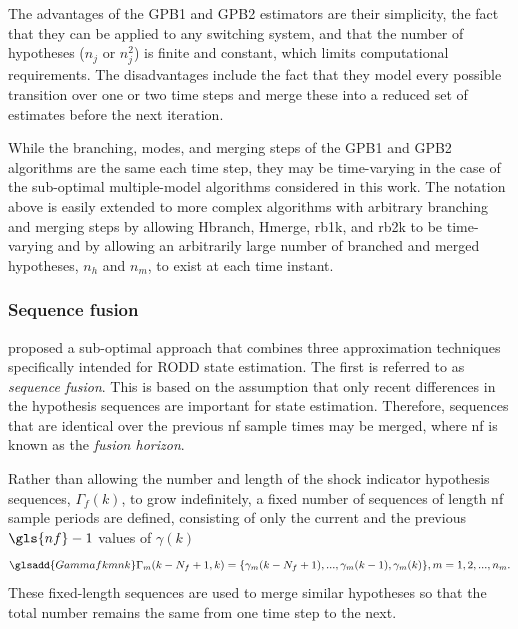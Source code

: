 The advantages of the \gls{GPB1} and \gls{GPB2} estimators are their simplicity, the fact that they can be applied to any switching system, and that the number of hypotheses ($n_j$ or $n_j^2$) is finite and constant, which limits computational requirements. The disadvantages include the fact that they model every possible transition over one or two time steps and merge these into a reduced set of estimates before the next iteration. 

While the branching, modes, and merging steps of the \gls{GPB1} and \gls{GPB2} algorithms are the same each time step, they may be time-varying in the case of the sub-optimal multiple-model algorithms considered in this work. The notation above is easily extended to more complex algorithms with arbitrary branching and merging steps by allowing \gls{Hbranch}, \gls{Hmerge}, \gls{rb1k}, and \gls{rb2k} to be time-varying and by allowing an arbitrarily large number of branched and merged hypotheses, $n_h$ and $n_m$, to exist at each time instant.

\subsubsection{Sequence fusion} \label{sec:fusion}

\cite{robertson_detection_1995} proposed a sub-optimal approach that combines three approximation techniques specifically intended for \gls{RODD} state estimation. The first is referred to as \textit{sequence fusion}. This is based on the assumption that only recent differences in the hypothesis sequences are important for state estimation. Therefore, sequences that are identical over the previous \gls{nf} sample times may be merged, where \gls{nf} is known as the \textit{fusion horizon}.

Rather than allowing the number and length of the shock indicator hypothesis sequences, $\Gamma_f(k)$, to grow indefinitely, a fixed number of sequences of length \gls{nf} sample periods are defined, consisting of only the current and the previous $\gls{nf}-1$ values of $\gamma(k)$
\begin{equation} \label{eq:Gamma_kmf_k}
	\glsadd{Gammafkmnk}\Gamma_m(k-N_f+1,k)=\{\gamma_m(k-N_f+1), ...,  \gamma_m(k-1), \gamma_m(k)\}, m=1,2,..., n_m.
\end{equation}
These fixed-length sequences are used to merge similar hypotheses so that the total number remains the same from one time step to the next.

